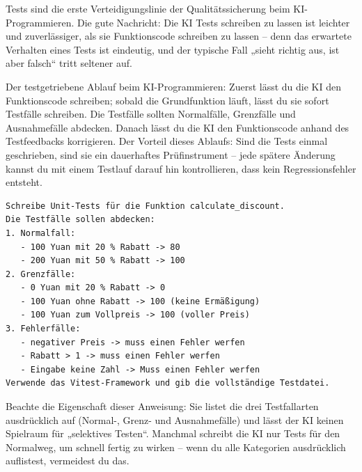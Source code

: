 


Tests sind die erste Verteidigungslinie der Qualitätssicherung beim KI-Programmieren. Die gute Nachricht: Die KI Tests schreiben zu lassen ist leichter und zuverlässiger, als sie Funktionscode schreiben zu lassen – denn das erwartete Verhalten eines Tests ist eindeutig, und der typische Fall „sieht richtig aus, ist aber falsch“ tritt seltener auf.

Der testgetriebene Ablauf beim KI-Programmieren: Zuerst lässt du die KI den Funktionscode schreiben; sobald die Grundfunktion läuft, lässt du sie sofort Testfälle schreiben. Die Testfälle sollten Normalfälle, Grenzfälle und Ausnahmefälle abdecken. Danach lässt du die KI den Funktionscode anhand des Testfeedbacks korrigieren. Der Vorteil dieses Ablaufs: Sind die Tests einmal geschrieben, sind sie ein dauerhaftes Prüfinstrument – jede spätere Änderung kannst du mit einem Testlauf darauf hin kontrollieren, dass kein Regressionsfehler entsteht.

\begin{lstlisting}
Schreibe Unit-Tests für die Funktion calculate_discount.
Die Testfälle sollen abdecken:
1. Normalfall:
   - 100 Yuan mit 20 % Rabatt -> 80
   - 200 Yuan mit 50 % Rabatt -> 100
2. Grenzfälle:
   - 0 Yuan mit 20 % Rabatt -> 0
   - 100 Yuan ohne Rabatt -> 100 (keine Ermäßigung)
   - 100 Yuan zum Vollpreis -> 100 (voller Preis)
3. Fehlerfälle:
   - negativer Preis -> muss einen Fehler werfen
   - Rabatt > 1 -> muss einen Fehler werfen
   - Eingabe keine Zahl -> Muss einen Fehler werfen
Verwende das Vitest-Framework und gib die vollständige Testdatei.
\end{lstlisting}

Beachte die Eigenschaft dieser Anweisung: Sie listet die drei Testfallarten ausdrücklich auf (Normal-, Grenz- und Ausnahmefälle) und lässt der KI keinen Spielraum für „selektives Testen“. Manchmal schreibt die KI nur Tests für den Normalweg, um schnell fertig zu wirken – wenn du alle Kategorien ausdrücklich auflistest, vermeidest du das.

